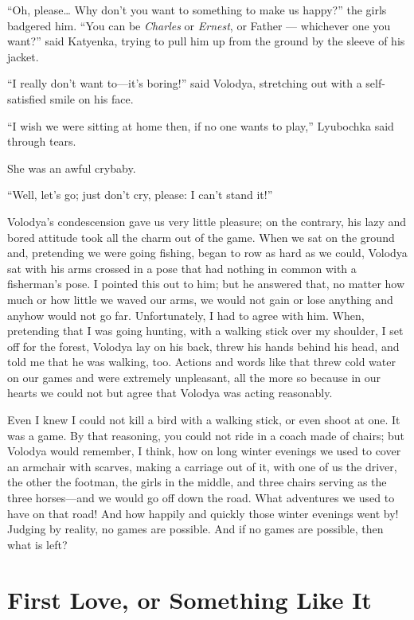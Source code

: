``Oh, please\ldots{} Why don't you want to something to make us happy?'' the girls badgered him. ``You can be \textit{Charles} or \textit{Ernest}, or Father --- whichever one you want?'' said Katyenka, trying to pull him up from the ground by the sleeve of his jacket. %

``I really don't want to---it's boring!'' said Volodya, stretching out with a self-satisfied smile on his face.

``I wish we were sitting at home then, if no one wants to play,'' Lyubochka said through tears. %

She was an awful crybaby.

``Well, let's go; just don't cry, please: I can't stand it!'' %

Volodya's condescension gave us very little pleasure; on the contrary, his lazy and bored attitude took all the charm out of the game. When we sat on the ground and, pretending we were going fishing, began to row as hard as we could, Volodya sat with his arms crossed in a pose that had nothing in common with a fisherman's pose. I pointed this out to him; but he answered that, no matter how much or how little we waved our arms, we would not gain or lose anything and anyhow would not go far. Unfortunately, I had to agree with him. When, pretending that I was going hunting, with a walking stick over my shoulder, I set off for the forest, Volodya lay on his back, threw his hands behind his head, and told me that he was walking, too. Actions and words like that threw cold water on our games and were extremely unpleasant, all the more so because in our hearts we could not but agree that Volodya was acting reasonably.

Even I knew I could not kill a bird with a walking stick, or even shoot at one. It was a game. By that reasoning, you could not ride in a coach made of chairs; but Volodya would remember, I think, how on long winter evenings we used to cover an armchair with scarves, making a carriage out of it, with one of us the driver, the other the footman, the girls in the middle, and three chairs serving as the three horses---and we would go off down the road. What adventures we used to have on that road! And how happily and quickly those winter evenings went by! Judging by reality, no games are possible. And if no games are possible, then what is left?

\chapter{First Love, or Something Like It} %

